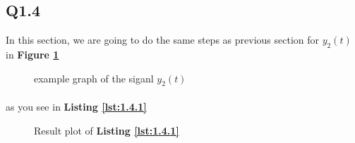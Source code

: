 \subsection{Q1.4}
In this section, we are going to do the same steps as previous section
for $y_2(t)$ in \textbf{Figure \ref{fig:ex3}}

\begin{figure}[H]
  \centering
 \caption{example graph of the siganl $y_2(t)$}
   \label{fig:ex3}
\end{figure}
\paragraph{} as you see in \textbf{Listing \ref{lst:1.4.1}}
\vspace{2ex}

\begin{figure}[H]
  \resizebox{\textwidth}{!}{}
  \caption{Result plot of \textbf{Listing \ref{lst:1.4.1}}}
  \label{fig:2.8}
\end{figure}
